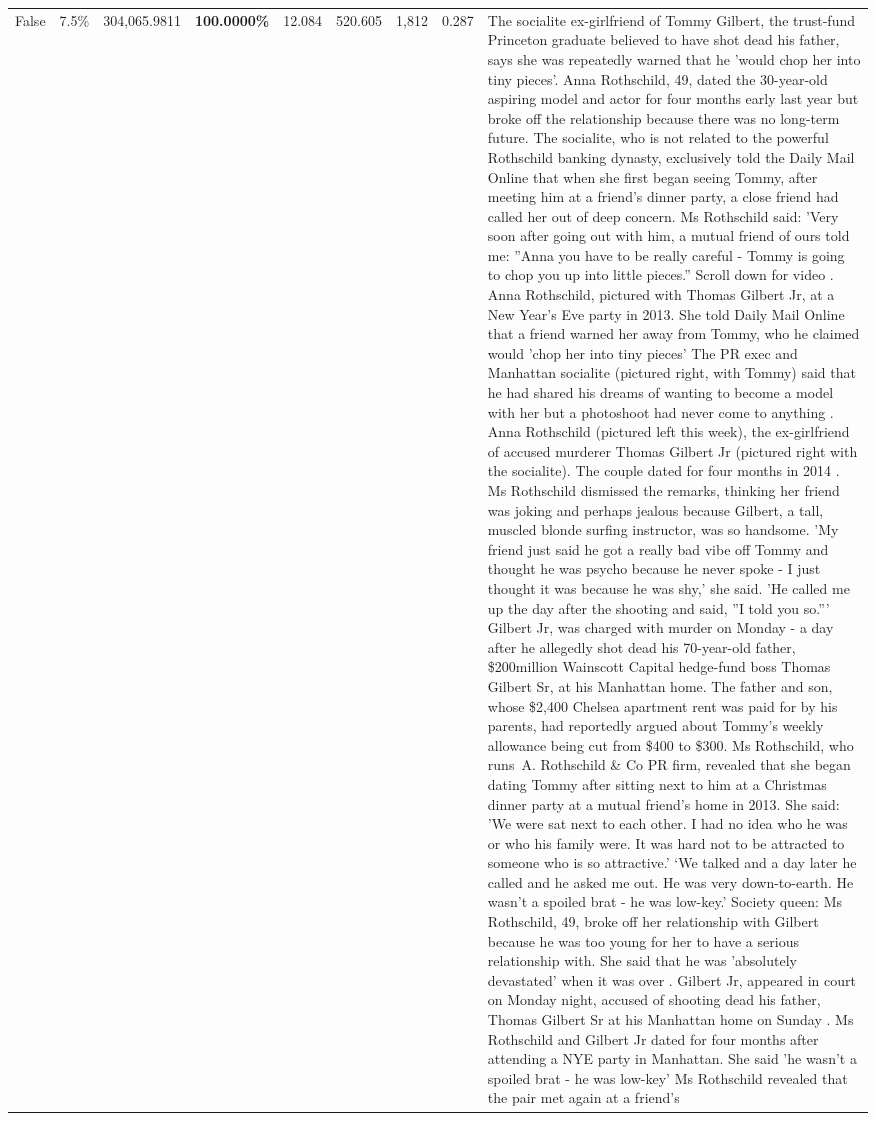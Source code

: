 \begin{table}[H]
\begin{tabular}{lllrlllll}
False & 7.5\% & \color{red} 304,065.9811 & \bfseries \color{red} 100.0000\% & 12.084 & 520.605 & 1,812 & 0.287 & The socialite ex-girlfriend of Tommy Gilbert, the trust-fund Princeton graduate believed to have shot dead his father, says she was repeatedly warned that he 'would chop her into tiny pieces'. Anna Rothschild, 49, dated the 30-year-old aspiring model and actor for four months early last year but broke off the relationship because there was no long-term future. The socialite, who is not related to the powerful Rothschild banking dynasty, exclusively told the Daily Mail Online that when she first began seeing Tommy, after meeting him at a friend's dinner party, a close friend had called her out of deep concern. Ms Rothschild said: 'Very soon after going out with him, a mutual friend of ours told me: ''Anna you have to be really careful - Tommy is going to chop you up into little pieces.'' Scroll down for video . Anna Rothschild, pictured with Thomas Gilbert Jr, at a New Year's Eve party in 2013. She told Daily Mail Online that a friend warned her away from Tommy, who he claimed would 'chop her into tiny pieces' The PR exec and Manhattan socialite (pictured right, with Tommy) said that he had shared his dreams of wanting to become a model with her but a photoshoot had never come to anything . Anna Rothschild (pictured left this week), the ex-girlfriend of accused murderer Thomas Gilbert Jr (pictured right with the socialite). The couple dated for four months in 2014 . Ms Rothschild dismissed the remarks, thinking her friend was joking and perhaps jealous because Gilbert, a tall, muscled blonde surfing instructor, was so handsome. 'My friend just said he got a really bad vibe off Tommy and thought he was psycho because he never spoke - I just thought it was because he was shy,' she said. 'He called me up the day after the shooting and said, ''I told you so.''' Gilbert Jr, was charged with murder on Monday - a day after he allegedly shot dead his 70-year-old father, \$200million Wainscott Capital hedge-fund boss Thomas Gilbert Sr, at his Manhattan home. The father and son, whose \$2,400 Chelsea apartment rent was paid for by his parents, had reportedly argued about Tommy's weekly allowance being cut from \$400 to \$300. Ms Rothschild, who runs A. Rothschild \& Co PR firm, revealed that she began dating Tommy after sitting next to him at a Christmas dinner party at a mutual friend's home in 2013. She said: 'We were sat next to each other. I had no idea who he was or who his family were. It was hard not to be attracted to someone who is so attractive.' ‘We talked and a day later he called and he asked me out. He was very down-to-earth. He wasn’t a spoiled brat - he was low-key.’ Society queen: Ms Rothschild, 49, broke off her relationship with Gilbert because he was too young for her to have a serious relationship with. She said that he was 'absolutely devastated' when it was over . Gilbert Jr, appeared in court on Monday night, accused of shooting dead his father, Thomas Gilbert Sr at his Manhattan home on Sunday . Ms Rothschild and Gilbert Jr dated for four months after attending a NYE party in Manhattan. She said 'he wasn't a spoiled brat - he was low-key' Ms Rothschild revealed that the pair met again at a friend’s 
\end{tabular}
\end{table}
